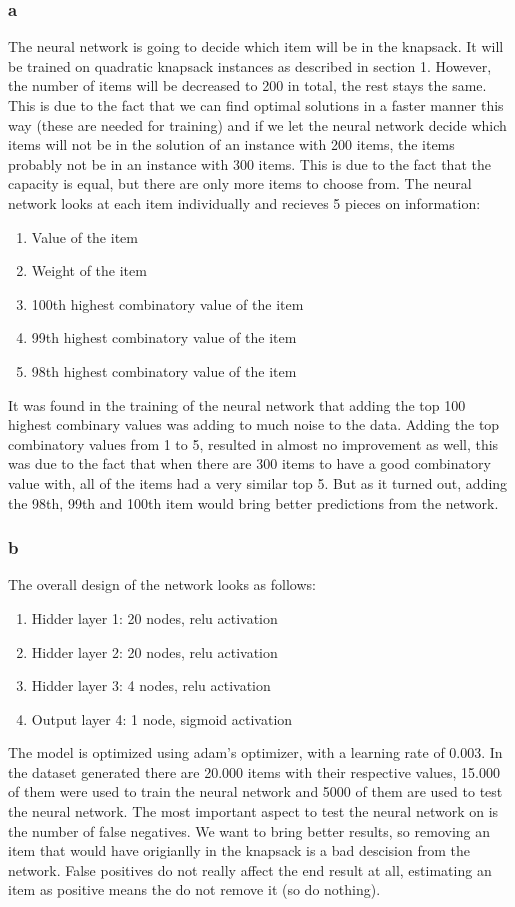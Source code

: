\subsubsection*{a}
The neural network is going to decide which item will be in the knapsack. It will be trained on quadratic knapsack instances as described in section 1. However, the number of items will be decreased to 200 in total, the rest stays the same. This is due to the fact that we can find optimal solutions in a faster manner this way (these are needed for training) and if we let the neural network decide which items will not be in the solution of an instance with 200 items, the items probably not be in an instance with 300 items. This is due to the fact that the capacity is equal, but there are only more items to choose from. The neural network looks at each item individually and recieves 5 pieces on information: 
\begin{enumerate}
	\item Value of the item
	\item Weight of the item
	\item 100th highest combinatory value of the item
	\item 99th highest combinatory value of the item
	\item 98th highest combinatory value of the item
\end{enumerate}
It was found in the training of the neural network that adding the top 100 highest combinary values was adding to much noise to the data. Adding the top combinatory values from 1 to 5, resulted in almost no improvement as well, this was due to the fact that when there are 300 items to have a good combinatory value with, all of the items had a very similar top 5. But as it turned out, adding the 98th, 99th and 100th item would bring better predictions from the network. 
\subsubsection*{b}
The overall design of the network looks as follows:
\begin{enumerate}
	\item Hidder layer 1: 20 nodes, relu activation
	\item Hidder layer 2: 20 nodes, relu activation
	\item Hidder layer 3: 4 nodes, relu activation
	\item Output layer 4: 1 node, sigmoid activation
\end{enumerate}
The model is optimized using adam's optimizer, with a learning rate of 0.003. In the dataset generated there are 20.000 items with their respective values, 15.000 of them were used to train the neural network and 5000 of them are used to test the neural network. The most important aspect to test the neural network on is the number of false negatives. We want to bring better results, so removing an item that would have origianlly in the knapsack is a bad descision from the network. False positives do not really affect the end result at all, estimating an item as positive means the do not remove it (so do nothing).
